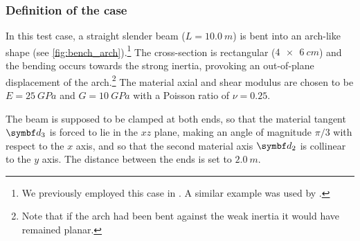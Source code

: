 \subsubsection{Definition of the case}

In this test case, a straight slender beam ($L = \SI{10.0}{m}$) is bent into an arch-like shape (see \cref{fig:bench_arch}).\footnote{We previously employed this case in \cite{Lefevre2017}. A similar example was used by .} The cross-section is rectangular ($\SI{4x6}{cm}$) and the bending occurs towards the strong inertia, provoking an out-of-plane displacement of the arch.\footnote{Note that if the arch had been bent against the weak inertia it would have remained planar.} The material axial and shear modulus are chosen to be $E=\SI{25}{GPa}$ and $G=\SI{10}{GPa}$ with a Poisson ratio of $\nu=0.25$.

The beam is supposed to be clamped at both ends, so that the material tangent $\vect{d}_3$ is forced to lie in the $xz$ plane, making an angle of magnitude $\pi/3$ with respect to the $x$ axis, and so that the second material axis $\vect{d}_2$ is collinear to the $y$ axis. The distance between the ends is set to $\SI{2.0}{m}$.



